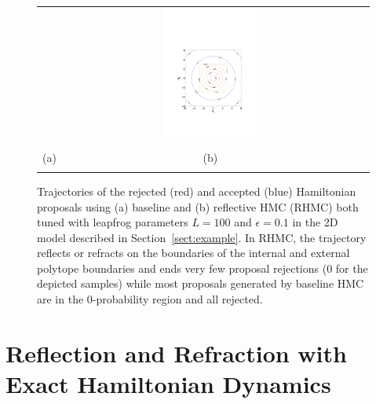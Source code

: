\documentclass{article} %
\begin{document}
\begin{figure}[t!]
\begin{center}
\begin{tabular}{ccc}
&\includegraphics[trim={3.2cm 6cm 3.2cm 9cm},clip,width=0.33\textwidth]{../plots3/dist_contour.pdf} 
\vspace{-1.5mm}
\\
   \hspace{-5mm} \footnotesize(a) 
& \hspace{-4mm} \footnotesize(b) 
\\
\multicolumn{2}{c}{}
\end{tabular}
\end{center}
\vspace{-8mm}
\caption{\footnotesize
Trajectories of the rejected (red) and accepted (blue) Hamiltonian proposals using (a) baseline and (b) reflective HMC (RHMC) both tuned with leapfrog parameters $L=100$ and $\epsilon=0.1$ in the 2D model described in Section~\ref{sect:example}. 
In RHMC, the trajectory reflects or refracts on the boundaries of the internal and external polytope boundaries and ends very few proposal rejections (0 for the depicted samples) while most proposals generated by baseline HMC are in the 0-probability region and all rejected.   
} 
\label{fig:mom}
\vspace{-10pt}
\end{figure}
\fi


\section{Reflection and Refraction with Exact Hamiltonian Dynamics}
\end{document}
